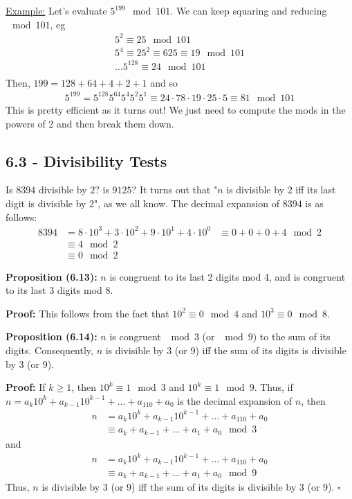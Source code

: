 \documentclass{article}
\newcommand*{\qed}{\hfill$\square$}%
\begin{document}
\underline{Example:} Let's evaluate $5^{199}\mod 101$. We can keep squaring and reducing $\mod 101$, eg \begin{align*}
    5^2\equiv 25\mod 101\\
    5^4\equiv 25^2\equiv 625\equiv 19\mod 101\\
    \dots
    5^128\equiv 24\mod 101\\
\end{align*}Then, $199=128+64+4+2+1$ and so \begin{align*}
    5^199=5^{128}5^{64}5^4 5^2 5^1\equiv 24\cdot 78\cdot 19\cdot 25\cdot 5\equiv 81\mod 101
\end{align*}This is pretty efficient as it turns out! We just need to compute the mods in the powers of 2 and then break them down. 

\subsection{6.3 - Divisibility Tests}

Is $8394$ divisible by $2?$ is $9125$? It turns out that "$n$ is divisible by 2 iff its last digit is divisible by 2", as we all know. The decimal expansion of $8394$ is as follows: \begin{align*}
    8394&=8\cdot 10^3+3\cdot 10^2+9\cdot 10^1+4\cdot 10^0
    &\equiv 0 + 0 + 0 + 4\mod 2\\
    &\equiv 4\mod 2\\
    &\equiv 0\mod 2
\end{align*}

\textbf{Proposition (6.13):} $n$ is congruent to its last 2 digits mod 4, and is congruent to its last 3 digits mod 8.

\textbf{Proof:} This follows from the fact that $10^2\equiv 0\mod 4$ and $10^3\equiv 0\mod 8$.

\textbf{Proposition (6.14):} $n$ is congruent $\mod 3$ (or $\mod 9$) to the sum of its digits. Consequently, $n$ is divisible by 3 (or 9) iff the sum of its digits is divisible by 3 (or 9).

\textbf{Proof:} If $k\geq 1$, then $10^k\equiv 1\mod 3$ and $10^k\equiv 1\mod 9$. Thus, if $n=a_k10^k+a_{k-1}10^{k-1}+\dots + a_110+a_0$ is the decimal expansion of $n$, then \begin{align*}
    n&=a_k10^k+a_{k-1}10^{k-1}+\dots + a_110+a_0\\
    &\equiv a_k+a_{k-1}+\dots + a_1+a_0\mod 3
\end{align*}and \begin{align*}
    n&=a_k10^k+a_{k-1}10^{k-1}+\dots + a_110+a_0\\
    &\equiv a_k+a_{k-1}+\dots + a_1+a_0\mod 9
\end{align*}Thus, $n$ is divisible by 3 (or 9) iff the sum of its digits is divisible by 3 (or 9). \qed
\end{document}
